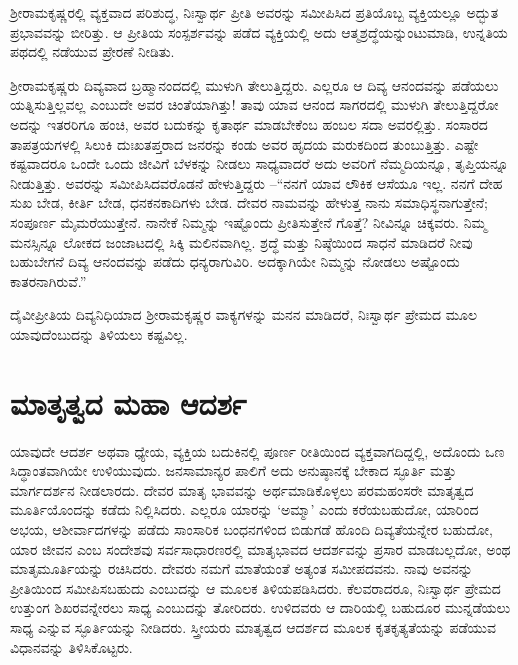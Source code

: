 \newpage

ಶ‍್ರೀರಾಮಕೃಷ್ಣರಲ್ಲಿ ವ್ಯಕ್ತವಾದ ಪರಿಶುದ್ಧ, ನಿಃಸ್ವಾರ್ಥ ಪ್ರೀತಿ ಅವರನ್ನು ಸಮೀಪಿಸಿದ ಪ್ರತಿ\-ಯೊಬ್ಬ ವ್ಯಕ್ತಿಯಲ್ಲೂ ಅದ್ಭುತ ಪ್ರಭಾವವನ್ನು ಬೀರಿತ್ತು. ಆ ಪ್ರೀತಿಯ ಸಂಸ್ಪರ್ಶವನ್ನು ಪಡೆದ ವ್ಯಕ್ತಿಯಲ್ಲಿ ಅದು ಆತ್ಮಶ್ರದ್ಧೆಯನ್ನುಂಟುಮಾಡಿ, ಉನ್ನತಿಯ ಪಥದಲ್ಲಿ ನಡೆಯುವ ಪ್ರೇರಣೆ ನೀಡಿತು.

ಶ‍್ರೀರಾಮಕೃಷ್ಣರು ದಿವ್ಯವಾದ ಬ್ರಹ್ಮಾನಂದದಲ್ಲಿ ಮುಳುಗಿ ತೇಲುತ್ತಿದ್ದರು. ಎಲ್ಲರೂ ಆ ದಿವ್ಯ ಆನಂದವನ್ನು ಪಡೆಯಲು ಯತ್ನಿಸುತ್ತಿಲ್ಲವಲ್ಲ ಎಂಬುದೇ ಅವರ ಚಿಂತೆಯಾಗಿತ್ತು! ತಾವು ಯಾವ ಆನಂದ ಸಾಗರದಲ್ಲಿ ಮುಳುಗಿ ತೇಲುತ್ತಿದ್ದರೋ ಅದನ್ನು ಇತರರಿಗೂ ಹಂಚಿ, ಅವರ ಬದುಕನ್ನು ಕೃತಾರ್ಥ ಮಾಡಬೇಕೆಂಬ ಹಂಬಲ ಸದಾ ಅವರಲ್ಲಿತ್ತು. ಸಂಸಾರದ ತಾಪತ್ರಯಗಳಲ್ಲಿ ಸಿಲುಕಿ ದುಃಖತಪ್ತರಾದ ಜನರನ್ನು ಕಂಡು ಅವರ ಹೃದಯ ಮರುಕದಿಂದ ತುಂಬುತ್ತಿತ್ತು. ಎಷ್ಟೇ ಕಷ್ಟವಾದರೂ ಒಂದೇ ಒಂದು ಜೀವಿಗೆ ಬೆಳಕನ್ನು ನೀಡಲು ಸಾಧ್ಯವಾದರೆ ಅದು ಅವರಿಗೆ ನೆಮ್ಮದಿಯನ್ನೂ, ತೃಪ್ತಿಯನ್ನೂ ನೀಡುತ್ತಿತ್ತು. ಅವರನ್ನು ಸಮೀಪಿಸಿದವರೊಡನೆ ಹೇಳುತ್ತಿದ್ದರು –“ನನಗೆ ಯಾವ ಲೌಕಿಕ ಆಸೆಯೂ ಇಲ್ಲ. ನನಗೆ ದೇಹ ಸುಖ ಬೇಡ, ಕೀರ್ತಿ ಬೇಡ, ಧನಕನಕಾದಿಗಳು ಬೇಡ. ದೇವರ ನಾಮವನ್ನು ಹೇಳುತ್ತ ನಾನು ಸಮಾಧಿಸ್ಥನಾಗುತ್ತೇನೆ; ಸಂಪೂರ್ಣ ಮೈಮರೆಯುತ್ತೇನೆ. ನಾನೇಕೆ ನಿಮ್ಮನ್ನು ಇಷ್ಟೊಂದು ಪ್ರೀತಿಸುತ್ತೇನೆ ಗೊತ್ತೆ? ನೀವಿನ್ನೂ ಚಿಕ್ಕವರು. ನಿಮ್ಮ ಮನಸ್ಸಿನ್ನೂ ಲೋಕದ ಜಂಜಾಟದಲ್ಲಿ ಸಿಕ್ಕಿ ಮಲಿನವಾಗಿಲ್ಲ. ಶ್ರದ್ಧೆ ಮತ್ತು ನಿಷ್ಠೆಯಿಂದ ಸಾಧನೆ ಮಾಡಿದರೆ ನೀವು ಬಹುಬೇಗನೆ ದಿವ್ಯ ಆನಂದವನ್ನು ಪಡೆದು ಧನ್ಯರಾಗುವಿರಿ. ಅದಕ್ಕಾಗಿಯೇ ನಿಮ್ಮನ್ನು ನೋಡಲು ಅಷ್ಟೊಂದು ಕಾತರನಾಗಿರುವೆ.”

ದೈವೀಪ್ರೀತಿಯ ದಿವ್ಯನಿಧಿಯಾದ ಶ‍್ರೀರಾಮಕೃಷ್ಣರ ವಾಕ್ಯಗಳನ್ನು ಮನನ ಮಾಡಿದರೆ, ನಿಃಸ್ವಾರ್ಥ ಪ್ರೇಮದ ಮೂಲ ಯಾವುದೆಂಬುದನ್ನು ತಿಳಿಯಲು ಕಷ್ಟವಿಲ್ಲ.


\section*{ಮಾತೃತ್ವದ ಮಹಾ ಆದರ್ಶ}


ಯಾವುದೇ ಆದರ್ಶ ಅಥವಾ ಧ್ಯೇಯ, ವ್ಯಕ್ತಿಯ ಬದುಕಿನಲ್ಲಿ ಪೂರ್ಣ ರೀತಿಯಿಂದ ವ್ಯಕ್ತವಾಗ\-ದಿದ್ದಲ್ಲಿ, ಅದೊಂದು ಒಣ ಸಿದ್ಧಾಂತವಾಗಿಯೇ ಉಳಿಯುವುದು. ಜನಸಾಮಾನ್ಯರ ಪಾಲಿಗೆ ಅದು ಅನುಷ್ಠಾನಕ್ಕೆ ಬೇಕಾದ ಸ್ಫೂರ್ತಿ ಮತ್ತು ಮಾರ್ಗದರ್ಶನ ನೀಡಲಾರದು. ದೇವರ ಮಾತೃ ಭಾವವನ್ನು ಅರ್ಥಮಾಡಿಕೊಳ್ಳಲು ಪರಮಹಂಸರೇ ಮಾತೃತ್ವದ ಮೂರ್ತಿಯೊಂದನ್ನು ಕಡೆದು ನಿಲ್ಲಿಸಿದರು. ಎಲ್ಲರೂ ಯಾರನ್ನು ‘ಅಮ್ಮಾ’ ಎಂದು ಕರೆಯಬಹುದೋ, ಯಾರಿಂದ ಅಭಯ, ಆಶೀರ್ವಾದಗಳನ್ನು ಪಡೆದು ಸಾಂಸಾರಿಕ ಬಂಧನಗಳಿಂದ ಬಿಡುಗಡೆ ಹೊಂದಿ ದಿವ್ಯತೆಯನ್ನೇರ ಬಹುದೋ, ಯಾರ ಜೀವನ ಎಂಬ ಸಂದೇಶವು ಸರ್ವಸಾಧಾರಣರಲ್ಲಿ ಮಾತೃಭಾವದ ಆದರ್ಶವನ್ನು ಪ್ರಸಾರ ಮಾಡಬಲ್ಲದೋ, ಅಂಥ ಮಾತೃಮೂರ್ತಿಯನ್ನು ರಚಿಸಿದರು. ದೇವರು ನಮಗೆ ಮಾತೆಯಂತೆ ಅತ್ಯಂತ ಸಮೀಪದವನು. ನಾವು ಅವನನ್ನು ಪ್ರೀತಿಯಿಂದ ಸಮೀಪಿಸಬಹುದು ಎಂಬುದನ್ನು ಆ ಮೂಲಕ ತಿಳಿಯಪಡಿಸಿದರು. ಕೆಲವರಾದರೂ, ನಿಃಸ್ವಾರ್ಥ ಪ್ರೇಮದ ಉತ್ತುಂಗ ಶಿಖರವನ್ನೇರಲು ಸಾಧ್ಯ ಎಂಬುದನ್ನು ತೋರಿದರು. ಉಳಿದವರು ಆ ದಾರಿಯಲ್ಲಿ ಬಹುದೂರ ಮುನ್ನಡೆಯಲು ಸಾಧ್ಯ ಎನ್ನುವ ಸ್ಫೂರ್ತಿಯನ್ನು ನೀಡಿದರು. ಸ್ತ್ರೀಯರು ಮಾತೃತ್ವದ ಆದರ್ಶದ ಮೂಲಕ ಕೃತಕೃತ್ಯತೆಯನ್ನು ಪಡೆಯುವ ವಿಧಾನವನ್ನು ತಿಳಿಸಿಕೊಟ್ಟರು.


